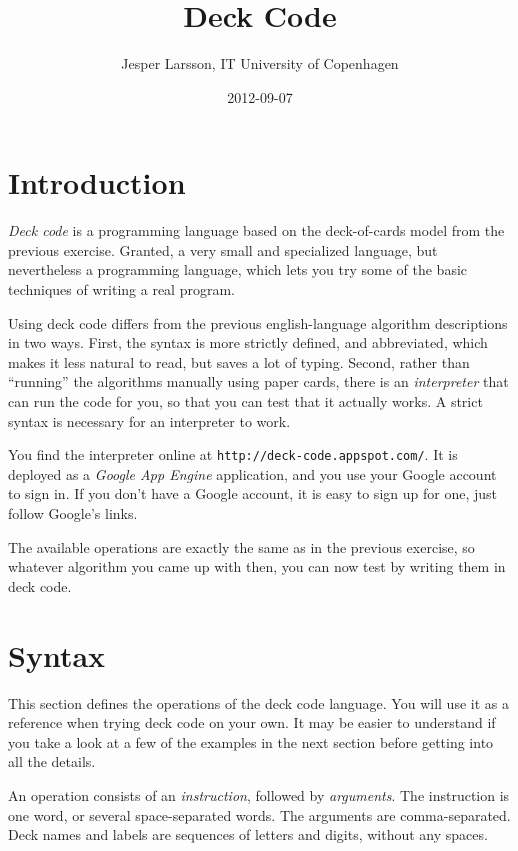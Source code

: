 \documentclass[a4paper,twoside]{tufte-handout}
\title{Deck Code}
\author{Jesper Larsson, IT University of Copenhagen}
\date{2012-09-07}
\begin{document}
\maketitle


\section{Introduction}\label{sec-intro}

\emph{Deck code} is a programming language based on the deck-of-cards
model from the previous exercise. Granted, a very small and
specialized language, but nevertheless a programming language, which
lets you try some of the basic techniques of writing a real program.

Using deck code differs from the previous english-language algorithm
descriptions in two ways. First, the syntax is more strictly defined,
and abbreviated, which makes it less natural to read, but saves a
lot of typing. Second, rather than ``running'' the algorithms manually
using paper cards, there is an \emph{interpreter} that can run the
code for you, so that you can test that it actually works. A strict
syntax is necessary for an interpreter to work.

You find the interpreter online at
\verb$http://deck-code.appspot.com/$. It is deployed as a \emph{Google
  App Engine} application, and you use your Google account to sign
in. If you don't have a Google account, it is easy to sign up for one,
just follow Google's links.

The available operations are exactly the same as in the previous
exercise, so whatever algorithm you came up with then, you can now
test by writing them in deck code.

\section{Syntax}\label{sec-syntax}

This section defines the operations of the deck code language. You
will use it as a reference when trying deck code on your own. It may
be easier to understand if you take a look at a few of the examples in
the next section before getting into all the details.

An operation consists of an \emph{instruction}, followed by
\emph{arguments}. The instruction is one word, or several
space-separated words. The arguments are comma-separated. Deck names
and labels are sequences of letters and digits, without any spaces.
\end{document}
